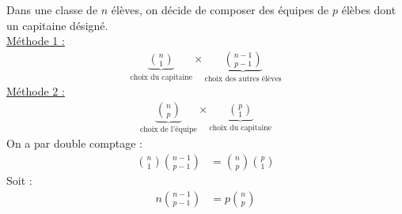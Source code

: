 \documentclass[../main.tex]{subfiles}
\begin{document}
\noindent Dans une classe de $n$ élèves, on décide de composer des équipes de $p$ élèbes dont un capitaine désigné. \\
\underline{Méthode 1 :} \\
\begin{align*}
    \underbrace{\binom{n}{1}}_{\text{choix du capitaine}}\times \underbrace{\binom{n-1}{p-1}}_{\text{choix des autres élèves}}
\end{align*}
\underline{Méthode 2 :} \\
\begin{align*}
    \underbrace{\binom{n}{p}}_{\text{choix de l'équipe}}\times \underbrace{\binom{p}{1}}_{\text{choix du capitaine}}
\end{align*}
On a par double comptage :
\begin{align*}
    \binom{n}{1} \binom{n-1}{p-1} &= \binom{n}{p} \binom{p}{1}
\end{align*}
Soit : 
\begin{align*}
    n\binom{n-1}{p-1} &= p\binom{n}{p}
\end{align*}
\end{document}
